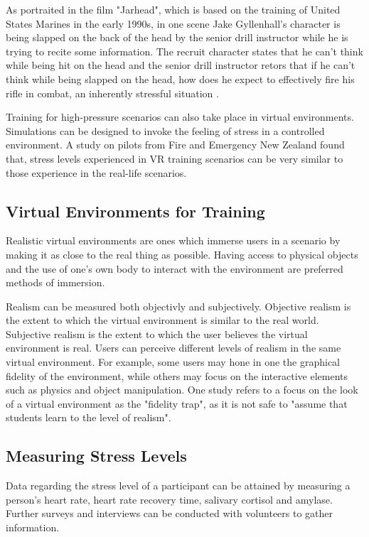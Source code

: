 \documentclass[12pt]{article}
\begin{document}
As portraited in the film "Jarhead", which is based on the training of United States Marines in the early 1990s, in one scene Jake Gyllenhall's character is being slapped on the back of the head by the senior drill instructor while he is trying to recite some information. The recruit character states that he can't think while being hit on the head and the senior drill instructor retors that if he can't think while being slapped on the head, how does he expect to effectively fire his rifle in combat, an inherently stressful situation \cite{jarhead2005}.

Training for high-pressure scenarios can also take place in virtual environments. Simulations can be designed to invoke the feeling of stress in a controlled environment. A study on pilots from Fire and Emergency New Zealand found that, stress levels experienced in VR training scenarios can be very similar to those experience in the real-life scenarios. \cite{clifford2019creating}

\subsection{Virtual Environments for Training}

Realistic virtual environments are ones which immerse users in a scenario by making it as close to the real thing as possible. Having access to physical objects and the use of one's own body to interact with the environment are preferred methods of immersion. \cite{clifford2018effect}

Realism can be measured both objectivly and subjectively. \cite{gonccalves2022systematic} Objective realism is the extent to which the virtual environment is similar to the real world. Subjective realism is the extent to which the user believes the virtual environment is real. Users can perceive different levels of realism in the same virtual environment. For example, some users may hone in one the graphical fidelity of the environment, while others may focus on the interactive elements such as physics and object manipulation. One study refers to a focus on the look of a virtual environment as the "fidelity trap", as it is not safe to "assume that students learn to the level of realism". \cite{carey2020high}

\subsection{Measuring Stress Levels}

Data regarding the stress level of a participant can be attained by measuring a person's heart rate, heart rate recovery time, salivary cortisol and amylase. Further surveys and interviews can be conducted with volunteers to gather information. \cite{liu2018impact}
\end{document}
